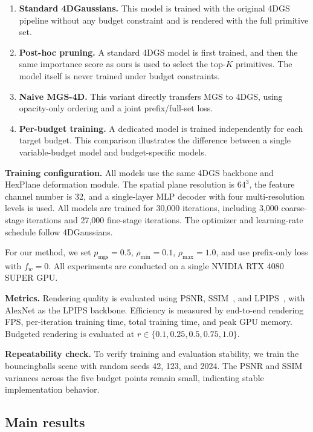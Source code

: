 \documentclass[pdflatex,sn-mathphys]{sn-jnl}
\begin{document}
\begin{enumerate}
    \item \textbf{Standard 4DGaussians.} This model is trained with the original 4DGS pipeline without any budget constraint and is rendered with the full primitive set.
    \item \textbf{Post-hoc pruning.} A standard 4DGS model is first trained, and then the same importance score as ours is used to select the top-$K$ primitives. The model itself is never trained under budget constraints.
    \item \textbf{Naive MGS-4D.} This variant directly transfers MGS to 4DGS, using opacity-only ordering and a joint prefix/full-set loss.
    \item \textbf{Per-budget training.} A dedicated model is trained independently for each target budget. This comparison illustrates the difference between a single variable-budget model and budget-specific models.
\end{enumerate}

\textbf{Training configuration.} All models use the same 4DGS backbone and HexPlane deformation module. The spatial plane resolution is $64^3$, the feature channel number is 32, and a single-layer MLP decoder with four multi-resolution levels is used. All models are trained for 30,000 iterations, including 3,000 coarse-stage iterations and 27,000 fine-stage iterations. The optimizer and learning-rate schedule follow 4DGaussians.

For our method, we set $p_{\mathrm{mgs}}=0.5$, $\rho_{\min}=0.1$, $\rho_{\max}=1.0$, and use prefix-only loss with $f_w=0$. All experiments are conducted on a single NVIDIA RTX 4080 SUPER GPU.

\textbf{Metrics.} Rendering quality is evaluated using PSNR, SSIM~\cite{wang2004ssim}, and LPIPS~\cite{zhang2018lpips}, with AlexNet as the LPIPS backbone. Efficiency is measured by end-to-end rendering FPS, per-iteration training time, total training time, and peak GPU memory. Budgeted rendering is evaluated at $r \in \{0.1,0.25,0.5,0.75,1.0\}$.

\textbf{Repeatability check.} To verify training and evaluation stability, we train the bouncingballs scene with random seeds 42, 123, and 2024. The PSNR and SSIM variances across the five budget points remain small, indicating stable implementation behavior.

\subsection{Main results}
\label{sec:main}
\end{document}
